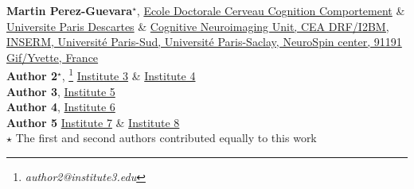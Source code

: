 \textbf{Martin Perez-Guevara}$^\star$, \href{http://ed3c.upmc.fr/}{Ecole Doctorale Cerveau Cognition Comportement} \& \href{http://www.parisdescartes.fr/}{Universite Paris Descartes} \& \href{www.unicog.org}{Cognitive Neuroimaging Unit, CEA DRF/I2BM, INSERM, Université Paris-Sud, Université Paris-Saclay, NeuroSpin center, 91191 Gif/Yvette, France}\\ \textbf{Author 2}$^\star$, \footnote{\textit{author2@institute3.edu}} \href{https://www.authorea.com/inst/}{Institute 3} \& \href{https://www.authorea.com/inst/}{Institute 4} \\ \textbf{Author 3}, \href{https://www.authorea.com/inst/}{Institute 5}\\ \textbf{Author 4}, \href{https://www.authorea.com/inst/}{Institute 6} \\ \textbf{Author 5} \href{https://www.authorea.com/inst/}{Institute 7} \& \href{https://www.authorea.com/inst/}{Institute 8}\\ $\star$ The first and second authors contributed equally to this work

